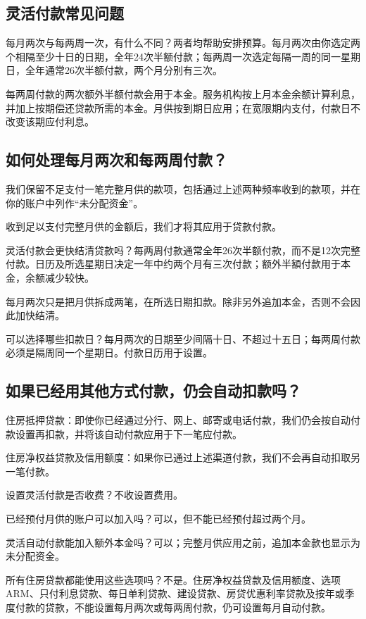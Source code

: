 \documentclass[UTF8,fontset=none,11pt,a4paper]{ctexart}
\begin{document}
\subsection*{灵活付款常见问题}
每月两次与每两周一次，有什么不同？两者均帮助安排预算。每月两次由你选定两个相隔至少十日的日期，全年24次半额付款；每两周一次选定每隔一周的同一星期日，全年通常26次半额付款，两个月分别有三次。


每两周付款的两次额外半额付款会用于本金。服务机构按上月本金余额计算利息，并加上按期偿还贷款所需的本金。月供按到期日应用；在宽限期内支付，付款日不改变该期应付利息。


\subsection*{如何处理每月两次和每两周付款？}
我们保留不足支付一笔完整月供的款项，包括通过上述两种频率收到的款项，并在你的账户中列作“未分配资金”。


收到足以支付完整月供的金额后，我们才将其应用于贷款付款。


灵活付款会更快结清贷款吗？每两周付款通常全年26次半额付款，而不是12次完整付款。日历及所选星期日决定一年中约两个月有三次付款；额外半額付款用于本金，余额减少较快。


每月两次只是把月供拆成两笔，在所选日期扣款。除非另外追加本金，否则不会因此加快结清。


可以选择哪些扣款日？每月两次的日期至少间隔十日、不超过十五日；每两周付款必须是隔周同一个星期日。付款日历用于设置。


\subsection*{如果已经用其他方式付款，仍会自动扣款吗？}
住房抵押贷款：即使你已经通过分行、网上、邮寄或电话付款，我们仍会按自动付款设置再扣款，并将该自动付款应用于下一笔应付款。


住房净权益贷款及信用额度：如果你已通过上述渠道付款，我们不会再自动扣取另一笔付款。


设置灵活付款是否收费？不收设置费用。


已经预付月供的账户可以加入吗？可以，但不能已经预付超过两个月。


灵活自动付款能加入额外本金吗？可以；完整月供应用之前，追加本金款也显示为未分配资金。


所有住房贷款都能使用这些选项吗？不是。住房净权益贷款及信用额度、选项ARM、只付利息贷款、每日单利贷款、建设贷款、房贷优惠利率贷款及按年或季度付款的贷款，不能设置每月两次或每两周付款，仍可设置每月自动付款。
\end{document}
